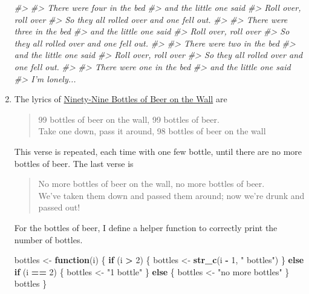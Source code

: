 \documentclass[]{book}
\newenvironment{Shaded}{\begin{snugshade}}{\end{snugshade}}
\newcommand{\CommentTok}[1]{\textcolor[rgb]{0.56,0.35,0.01}{\textit{#1}}}
\newcommand{\ControlFlowTok}[1]{\textcolor[rgb]{0.13,0.29,0.53}{\textbf{#1}}}
\newcommand{\DecValTok}[1]{\textcolor[rgb]{0.00,0.00,0.81}{#1}}
\newcommand{\KeywordTok}[1]{\textcolor[rgb]{0.13,0.29,0.53}{\textbf{#1}}}
\newcommand{\NormalTok}[1]{#1}
\newcommand{\OperatorTok}[1]{\textcolor[rgb]{0.81,0.36,0.00}{\textbf{#1}}}
\newcommand{\StringTok}[1]{\textcolor[rgb]{0.31,0.60,0.02}{#1}}
\theoremstyle{plain}
\theoremstyle{remark}
\begin{document}
\begin{enumerate}
\begin{Shaded}
\begin{Highlighting}[]
\CommentTok{#> }
\CommentTok{#> There were four in the bed}
\CommentTok{#> and the little one said}
\CommentTok{#> Roll over, roll over}
\CommentTok{#> So they all rolled over and one fell out.}
\CommentTok{#> }
\CommentTok{#> There were three in the bed}
\CommentTok{#> and the little one said}
\CommentTok{#> Roll over, roll over}
\CommentTok{#> So they all rolled over and one fell out.}
\CommentTok{#> }
\CommentTok{#> There were two in the bed}
\CommentTok{#> and the little one said}
\CommentTok{#> Roll over, roll over}
\CommentTok{#> So they all rolled over and one fell out.}
\CommentTok{#> }
\CommentTok{#> There were one in the bed}
\CommentTok{#> and the little one said}
\CommentTok{#> I'm lonely...}
\end{Highlighting}
\end{Shaded}
\item
  The lyrics of \href{https://en.wikipedia.org/wiki/99_Bottles_of_Beer}{Ninety-Nine Bottles of Beer on the Wall} are

  \begin{quote}
  99 bottles of beer on the wall, 99 bottles of beer.\\
  Take one down, pass it around, 98 bottles of beer on the wall
  \end{quote}

  This verse is repeated, each time with one few bottle, until
  there are no more bottles of beer. The last verse is

  \begin{quote}
  No more bottles of beer on the wall, no more bottles of beer.\\
  We've taken them down and passed them around; now we're drunk and passed out!
  \end{quote}

  For the bottles of beer, I define a helper function to correctly print the number of bottles.

\begin{Shaded}
\begin{Highlighting}[]
\NormalTok{bottles <-}\StringTok{ }\ControlFlowTok{function}\NormalTok{(i) \{}
  \ControlFlowTok{if}\NormalTok{ (i }\OperatorTok{>}\StringTok{ }\DecValTok{2}\NormalTok{) \{}
\NormalTok{   bottles <-}\StringTok{ }\KeywordTok{str_c}\NormalTok{(i }\OperatorTok{-}\StringTok{ }\DecValTok{1}\NormalTok{, }\StringTok{" bottles"}\NormalTok{)}
\NormalTok{  \} }\ControlFlowTok{else} \ControlFlowTok{if}\NormalTok{ (i }\OperatorTok{==}\StringTok{ }\DecValTok{2}\NormalTok{) \{}
\NormalTok{   bottles <-}\StringTok{ "1 bottle"}
\NormalTok{  \} }\ControlFlowTok{else}\NormalTok{ \{}
\NormalTok{   bottles <-}\StringTok{ "no more bottles"}
\NormalTok{  \}}
\NormalTok{  bottles}
\NormalTok{\}}


\end{Highlighting}
\end{Shaded}
\end{enumerate}
\end{document}
